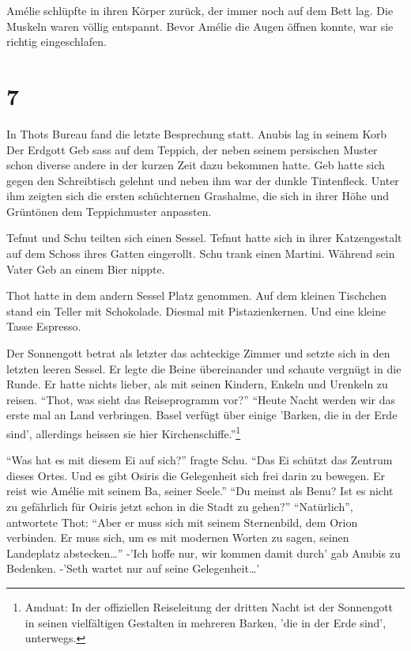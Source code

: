 \documentclass[11pt,titlepage,a5paper]{book}
\begin{document}
Amélie schlüpfte in ihren Körper zurück, der immer noch auf dem Bett lag. Die Muskeln waren völlig entspannt. Bevor Amélie die Augen öffnen konnte, war sie richtig eingeschlafen.

\section*{7}

In Thots Bureau fand die letzte Besprechung statt. Anubis lag in seinem Korb Der Erdgott Geb sass auf dem Teppich, der neben seinem persischen Muster schon diverse andere in der kurzen Zeit dazu bekommen hatte. Geb hatte sich gegen den Schreibtisch gelehnt und neben ihm war der dunkle Tintenfleck. Unter ihm zeigten sich die ersten schüchternen Grashalme, die sich in ihrer Höhe und Grüntönen dem Teppichmuster anpassten.

Tefnut und Schu teilten sich einen Sessel. Tefnut hatte sich in ihrer Katzengestalt auf dem Schoss ihres Gatten eingerollt. Schu trank einen Martini. Während sein Vater Geb an einem Bier nippte.

Thot hatte in dem andern Sessel Platz genommen. Auf dem kleinen Tischchen stand ein Teller mit Schokolade. Diesmal mit Pistazienkernen. Und eine kleine Tasse Espresso.  

Der Sonnengott betrat als letzter das achteckige Zimmer und setzte sich in den letzten leeren Sessel. Er legte die Beine übereinander und schaute vergnügt in die Runde. Er hatte nichts lieber, als mit seinen Kindern, Enkeln und Urenkeln zu reisen. "`Thot, was sieht das Reiseprogramm vor?"' "`Heute Nacht werden wir das erste mal an Land verbringen. Basel verfügt über einige 'Barken, die in der Erde sind', allerdings heissen sie hier Kirchenschiffe."'\footnote{Amduat: In der offiziellen Reiseleitung der dritten Nacht ist der Sonnengott in seinen vielfältigen Gestalten in mehreren Barken, 'die in der Erde sind', unterwegs.}

"`Was hat es mit diesem Ei auf sich?"' fragte Schu. "`Das Ei schützt das Zentrum dieses Ortes. Und es gibt Osiris die Gelegenheit sich frei darin zu bewegen. Er reist wie Amélie mit seinem Ba, seiner Seele."' "`Du meinst als Benu? Ist es nicht zu gefährlich für Osiris jetzt schon in die Stadt zu gehen?"' "`Natürlich"', antwortete Thot: "`Aber er muss sich mit seinem Sternenbild, dem Orion verbinden. Er muss sich, um es mit modernen Worten zu sagen, seinen Landeplatz abstecken\dots"' -'Ich hoffe nur, wir kommen damit durch' gab Anubis zu Bedenken. -'Seth wartet nur auf seine Gelegenheit\dots' 
\end{document}
